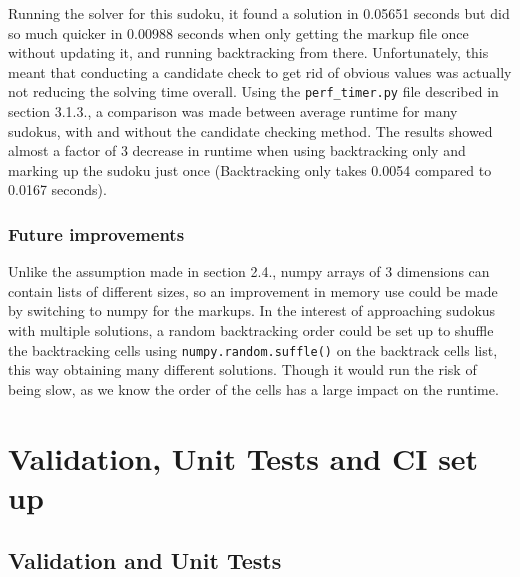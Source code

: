 \documentclass[12pt]{report} %
\begin{document}
Running the solver for this sudoku, it found a solution in 0.05651 seconds but did so much quicker in 0.00988 seconds when only getting the markup file once without updating it, and running backtracking from there. Unfortunately, this meant that conducting a candidate check to get rid of obvious values was actually not reducing the solving time overall. Using the \texttt{perf\_timer.py} file described in section 3.1.3., a comparison was made between average runtime for many sudokus, with and without the candidate checking method. The results showed almost a factor of 3 decrease in runtime when using backtracking only and marking up the sudoku just once (Backtracking only takes 0.0054 compared to 0.0167 seconds).

\subsection{Future improvements}

Unlike the assumption made in section 2.4., numpy arrays of 3 dimensions can contain lists of different sizes, so an improvement in memory use could be made by switching to numpy for the markups\cite{numpy_vs_pandas}.
In the interest of approaching sudokus with multiple solutions, a random backtracking order could be set up to shuffle the backtracking cells using \texttt{numpy.random.suffle()} on the backtrack cells list, this way obtaining many different solutions. Though it would run the risk of being slow, as we know the order of the cells has a large impact on the runtime.

\chapter{Validation, Unit Tests and CI set up}

\section{Validation and Unit Tests}
\end{document}
